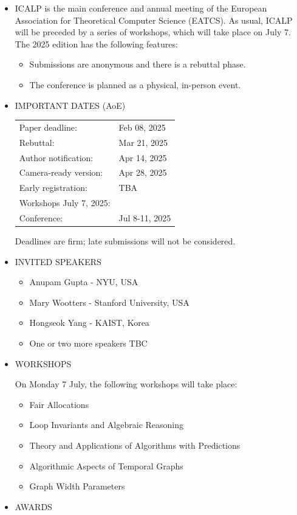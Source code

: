 \documentclass[prodmode,acmtecs]{acmsmall} %
\begin{document}
\begin{itemize}\item  ICALP is the main conference and annual meeting of the European Association for Theoretical Computer Science (EATCS). As usual, ICALP will be preceded by a series of workshops, which will take place on July 7. The 2025 edition has the following features: 
 
\begin{itemize}\item  Submissions are anonymous and there is a rebuttal phase.
\item  The conference is planned as a physical, in-person event.
\end{itemize} 
\item  IMPORTANT DATES (AoE) 
 
\begin{tabulary}{\linewidth}{LL}Paper deadline:  & Feb 08, 2025 \\
Rebuttal:  & Mar 21, 2025 \\
Author notification:  & Apr 14, 2025 \\
Camera-ready version:  & Apr 28, 2025 \\
Early registration:  & TBA \\
Workshops July 7, 2025:  &  \\
Conference:  & Jul 8-11, 2025 \\
\end{tabulary}
 
  Deadlines are firm; late submissions will not be considered. 
 
\item  INVITED SPEAKERS   
 
\begin{itemize}\item  Anupam Gupta - NYU, USA
\item  Mary Wootters - Stanford University, USA
\item  Hongseok Yang - KAIST, Korea
\item  One or two more speakers TBC
\end{itemize} 
\item  WORKSHOPS  
 
  On Monday 7 July, the following workshops will take place: 
 
\begin{itemize}\item  Fair Allocations
\item  Loop Invariants and Algebraic Reasoning
\item  Theory and Applications of Algorithms with Predictions
\item  Algorithmic Aspects of Temporal Graphs
\item  Graph Width Parameters
\end{itemize} 
\item  AWARDS  
 

\end{itemize}
\end{document}
